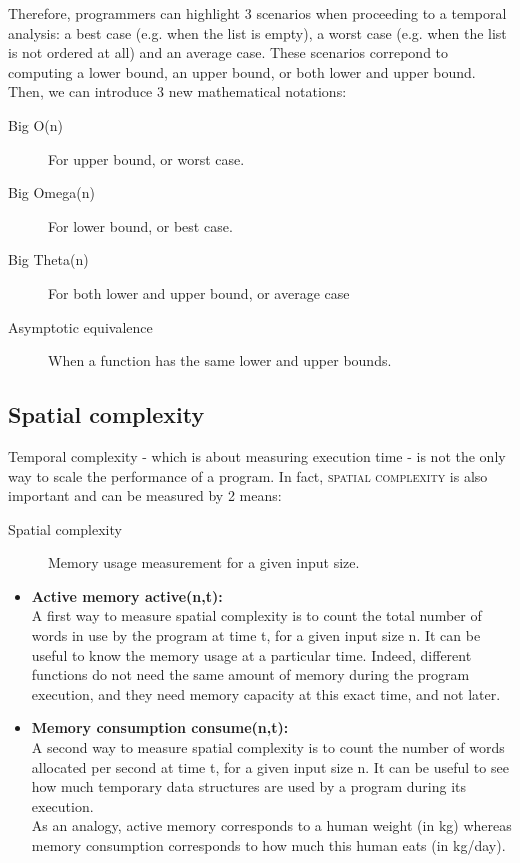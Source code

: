 \documentclass[11pt,a4paper,twoside,openright]{report}
\begin{document}
Therefore, programmers can highlight 3 scenarios when proceeding to a temporal 
analysis: a best case (e.g. when the list is empty), a worst case (e.g. when 
the list is not ordered at all) and an average case. These scenarios correpond 
to computing a lower bound, an upper bound, or both lower and upper bound. 
Then, 
we can introduce 3 new mathematical notations:

\begin{description}
	\item[Big O(n)] For upper bound, or worst case.
	\item[Big Omega(n)] For lower bound, or best case.
	\item[Big Theta(n)] For both lower and upper bound, or average case\\
	\item[Asymptotic equivalence] When a function has the same lower and 
upper bounds.
\end{description}

\subsection{Spatial complexity}

Temporal complexity - which is about measuring execution time - is not the only 
way to scale the performance of a program. In fact, \textsc{spatial complexity} 
is also important and can be measured by 2 means:

\begin{description}
  \item[Spatial complexity] Memory usage measurement for a given input size.
\end{description}

\begin{itemize}
	\item \textbf{Active memory active(n,t):}\\
	A first way to measure spatial complexity is to count the total number 
of words in use by the program at time t, for a given input size n. It can be 
useful to know the memory usage at a particular time. Indeed, different 
functions do not need the same amount of memory during the program execution, 
and they need memory capacity at this exact time, and not later.
	\item \textbf{Memory consumption consume(n,t):}\\
	A second way to measure spatial complexity is to count the number of 
words allocated per second at time t, for a given input size n. It can be 
useful 
to see how much temporary data structures are used by a program during its 
execution.\\
	As an analogy, active memory corresponds to a human weight (in kg) 
whereas memory consumption corresponds to how much this human eats (in kg/day).
\end{itemize}
\end{document}
